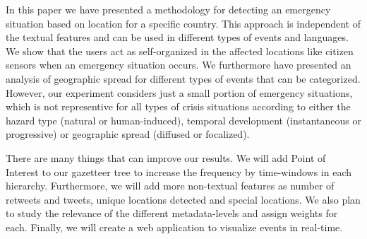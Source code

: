\documentclass[sigconf]{acmart}
\begin{document}
In this paper we have presented a methodology for detecting an emergency situation based on location for a specific country. This approach is independent of the textual features and can be used in different types of events and languages. We show that the users act as self-organized in the affected locations like citizen sensors when an emergency situation occurs. We furthermore have presented an analysis of geographic spread for different types of events that can be categorized. However, our experiment considers just a small portion of emergency situations, which is not representive for all types of crisis situations according to either the hazard type (natural or human-induced), temporal development (instantaneous or progressive) or geographic spread (diffused or focalized).

There are many things that can improve our results. We will add Point of Interest to our gazetteer tree to increase the frequency by time-windows in each hierarchy. Furthermore, we will add more non-textual features as number of retweets and tweets, unique locations detected and special locations. We also plan to study the relevance of the different metadata-levels and assign weights for each. Finally, we will create a web application to visualize events in real-time.

	




 
\end{document}
